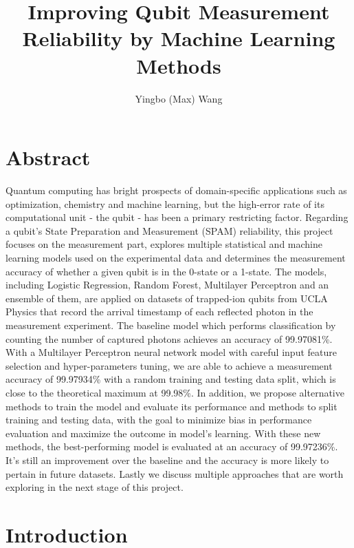 \documentclass[letterpaper,twocolumn,10pt]{article}
\begin{document}
\title{Improving Qubit Measurement Reliability by Machine Learning Methods}

\author{Yingbo (Max) Wang}

\maketitle

\section{Abstract}

Quantum computing has bright prospects of domain-specific applications such as optimization, chemistry and machine learning, but the high-error rate of its computational unit - the qubit - has been a primary restricting factor. Regarding a qubit's State Preparation and Measurement (SPAM) reliability, this project focuses on the measurement part, explores multiple statistical and machine learning models used on the experimental data and determines the measurement accuracy of whether a given qubit is in the 0-state or a 1-state. The models, including Logistic Regression, Random Forest, Multilayer Perceptron and an ensemble of them, are applied on datasets of trapped-ion qubits from UCLA Physics that record the arrival timestamp of each reflected photon in the measurement experiment. The baseline model which performs classification by counting the number of captured photons achieves an accuracy of 99.97081\%. With a Multilayer Perceptron neural network model with careful input feature selection and hyper-parameters tuning, we are able to achieve a measurement accuracy of 99.97934\% with a random training and testing data split, which is close to the theoretical maximum at 99.98\%. In addition, we propose alternative methods to train the model and evaluate its performance and methods to split training and testing data, with the goal to minimize bias in performance evaluation and maximize the outcome in model's learning. With these new methods, the best-performing model is evaluated at an accuracy of 99.97236\%. It's still an improvement over the baseline and the accuracy is more likely to pertain in future datasets. Lastly we discuss multiple approaches that are worth exploring in the next stage of this project.

\section{Introduction}
\end{document}
